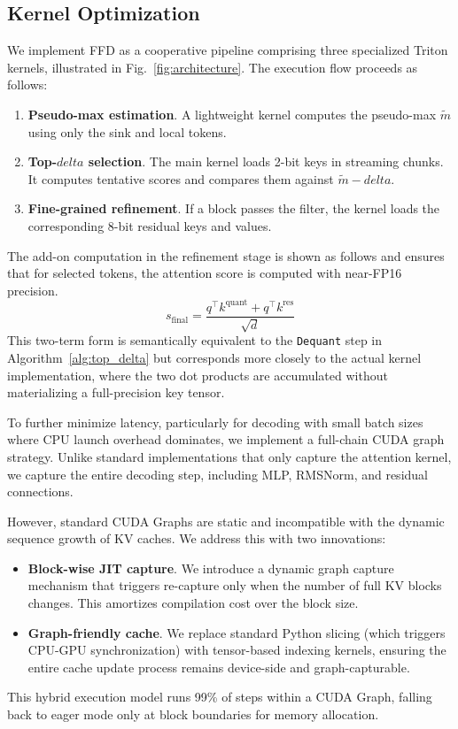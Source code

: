 \documentclass[]{mosi}
\def\bm#1{#1}%
\def\delta{delta}%
\theoremstyle{plain}
\theoremstyle{definition}
\theoremstyle{remark}
\begin{document}
\subsection{Kernel Optimization}
We implement FFD as a cooperative pipeline comprising three specialized Triton kernels, illustrated in Fig.~\ref{fig:architecture}. The execution flow proceeds as follows:
\begin{enumerate}
    \itemsep0em
    \item \textbf{Pseudo-max estimation}. A lightweight kernel computes the pseudo-max $\tilde{m}$ using only the sink and local tokens.
    \item \textbf{Top-$\bm\delta$ selection}. The main kernel loads 2-bit keys in streaming chunks. It computes tentative scores and compares them against $\tilde{m} - \delta$.
    \item \textbf{Fine-grained refinement}. If a block passes the filter, the kernel loads the corresponding 8-bit residual keys and values.
\end{enumerate}
The add-on computation in the refinement stage is shown as follows and ensures that for selected tokens, the attention score is computed with near-FP16 precision.
\begin{equation}
s_\text{final} = \frac{\bm{q}^\top\bm{k}^\text{quant} + \bm{q}^\top\bm{k}^\text{res}}{\sqrt{d}}
\end{equation}
This two-term form is semantically equivalent to the \texttt{Dequant} step in Algorithm~\ref{alg:top_delta} but corresponds more closely to the actual kernel implementation, where the two dot products are accumulated without materializing a full-precision key tensor.

To further minimize latency, particularly for decoding with small batch sizes where CPU launch overhead dominates, we implement a full-chain CUDA graph strategy. Unlike standard implementations that only capture the attention kernel, we capture the entire decoding step, including MLP, RMSNorm, and residual connections.

However, standard CUDA Graphs are static and incompatible with the dynamic sequence growth of KV caches. We address this with two innovations:
\begin{itemize}
    \itemsep0em
    \item \textbf{Block-wise JIT capture}. We introduce a dynamic graph capture mechanism that triggers re-capture only when the number of full KV blocks changes. This amortizes compilation cost over the block size.
    \item \textbf{Graph-friendly cache}. We replace standard Python slicing (which triggers CPU-GPU synchronization) with tensor-based indexing kernels, ensuring the entire cache update process remains device-side and graph-capturable.
\end{itemize}
This hybrid execution model runs 99\% of steps within a CUDA Graph, falling back to eager mode only at block boundaries for memory allocation.
\end{document}
